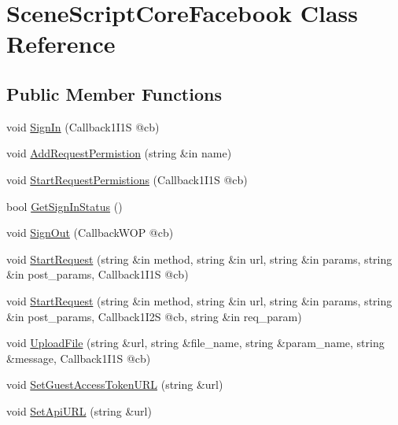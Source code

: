 \hypertarget{class_scene_script_core_facebook}{}\section{Scene\+Script\+Core\+Facebook Class Reference}
\label{class_scene_script_core_facebook}
\subsection*{Public Member Functions}
\begin{DoxyCompactItemize}
\item 
void \hyperlink{class_scene_script_core_facebook_aed2b7a17cacc812f3fecd73272df3165}{Sign\+In} (Callback1\+I1S @cb)
\item 
void \hyperlink{class_scene_script_core_facebook_a3d5bc1b3a3d8b93570ef8f55e5bcaaac}{Add\+Request\+Permistion} (string \&in name)
\item 
void \hyperlink{class_scene_script_core_facebook_a54ee20a40b3bb63dbd838f6baea3a2f2}{Start\+Request\+Permistions} (Callback1\+I1S @cb)
\item 
bool \hyperlink{class_scene_script_core_facebook_aa2b522a30c87ae2863e7f0582055ed40}{Get\+Sign\+In\+Status} ()
\item 
void \hyperlink{class_scene_script_core_facebook_a28b53be1f535f82eea876294f13e6d17}{Sign\+Out} (Callback\+W\+OP @cb)
\item 
void \hyperlink{class_scene_script_core_facebook_ae8605309cc071c90e36899799100a36a}{Start\+Request} (string \&in method, string \&in url, string \&in params, string \&in post\+\_\+params, Callback1\+I1S @cb)
\item 
void \hyperlink{class_scene_script_core_facebook_a39176c97d731e3f7992aaa57e80a9be1}{Start\+Request} (string \&in method, string \&in url, string \&in params, string \&in post\+\_\+params, Callback1\+I2S @cb, string \&in req\+\_\+param)
\item 
void \hyperlink{class_scene_script_core_facebook_a08e54937e9c02687e725ba3dab44f0e6}{Upload\+File} (string \&url, string \&file\+\_\+name, string \&param\+\_\+name, string \&message, Callback1\+I1S @cb)
\item 
void \hyperlink{class_scene_script_core_facebook_a507af0da72d626fed0b4c605a3af5e49}{Set\+Guest\+Access\+Token\+U\+RL} (string \&url)
\item 
void \hyperlink{class_scene_script_core_facebook_ad3d42b197d3f3ddd6b526e2f3e4a887a}{Set\+Api\+U\+RL} (string \&url)
\end{DoxyCompactItemize}


